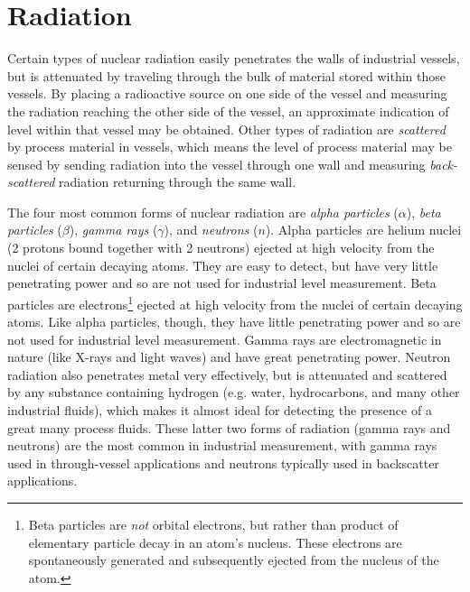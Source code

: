 \filbreak
\section{Radiation}

Certain types of nuclear radiation easily penetrates the walls of industrial vessels, but is attenuated by traveling through the bulk of material stored within those vessels.  By placing a radioactive source on one side of the vessel and measuring the radiation reaching the other side of the vessel, an approximate indication of level within that vessel may be obtained.  Other types of radiation are \textit{scattered} by process material in vessels, which means the level of process material may be sensed by sending radiation into the vessel through one wall and measuring \textit{back-scattered} radiation returning through the same wall.

The four most common forms of nuclear radiation are \textit{alpha particles} ($\alpha$), \textit{beta particles} ($\beta$), \textit{gamma rays} ($\gamma$), and \textit{neutrons} ($n$).  Alpha particles are helium nuclei (2 protons bound together with 2 neutrons) ejected at high velocity from the nuclei of certain decaying atoms.  They are easy to detect, but have very little penetrating power and so are not used for industrial level measurement.  Beta particles are electrons\footnote{Beta particles are \textit{not} orbital electrons, but rather than product of elementary particle decay in an atom's nucleus.  These electrons are spontaneously generated and subsequently ejected from the nucleus of the atom.} ejected at high velocity from the nuclei of certain decaying atoms.  Like alpha particles, though, they have little penetrating power and so are not used for industrial level measurement.  Gamma rays are electromagnetic in nature (like X-rays and light waves) and have great penetrating power.  Neutron radiation also penetrates metal very effectively, but is attenuated and scattered by any substance containing hydrogen (e.g. water, hydrocarbons, and many other industrial fluids), which makes it almost ideal for detecting the presence of a great many process fluids.  These latter two forms of radiation (gamma rays and neutrons) are the most common in industrial measurement, with gamma rays used in through-vessel applications and neutrons typically used in backscatter applications.                    

